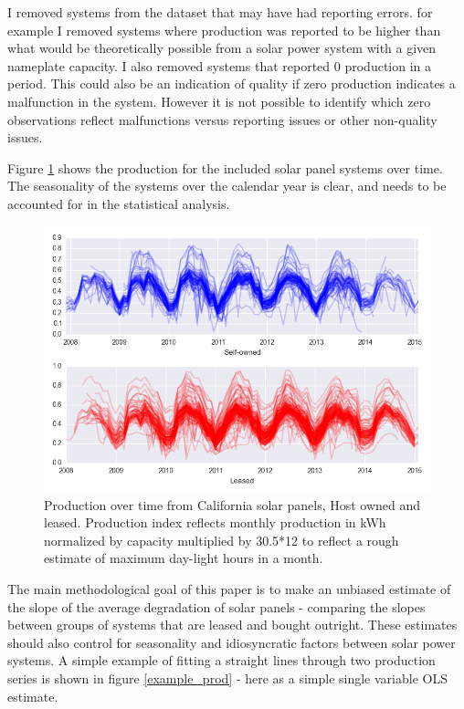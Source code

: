 \documentclass[12pt]{article}
\begin{document}
I removed systems from the dataset that may have had reporting errors. for example I removed systems where production was reported to be higher than what would be theoretically possible from a solar power system with a given nameplate capacity. I also removed systems that reported 0 production in a period. This could also be an indication of quality if zero production indicates a malfunction in the system. However it is not possible to identify which zero observations reflect malfunctions versus reporting issues or other non-quality issues. 

Figure \ref{tot_production} shows the production for the included solar panel systems over time. The seasonality of the systems over the calendar year is clear, and needs to be accounted for in the statistical analysis. 

\begin{figure}
	\includegraphics[width=1\textwidth]{tot_production.png}
	\caption{Production over time from California solar panels, Host owned and leased. Production index reflects monthly production in kWh normalized by capacity multiplied by 30.5*12 to reflect a rough estimate of maximum day-light hours in a month.}
	\label{tot_production}
\end{figure}

The main methodological goal of this paper is to make an unbiased estimate of the slope of the average degradation of solar panels - comparing the slopes between groups of systems that are leased and bought outright. These estimates should also control for seasonality and idiosyncratic factors between solar power systems.  
A simple example of fitting a straight lines through two production series is shown in figure \ref{example_prod} - here as a simple single variable OLS estimate.
\end{document}
